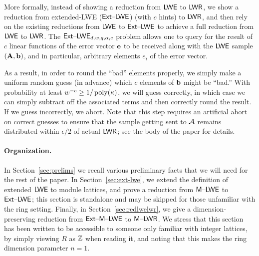 More formally, instead of showing a reduction from $\mathsf{LWE}$ to $\mathsf{LWR}$, we
show a reduction from extended-LWE ($\mathsf{Ext \text{\textendash} LWE}$) (with $c$
hints) to $\mathsf{LWR}$, and then rely on the existing reductions from $\mathsf{LWE}$
to $\mathsf{Ext \text{\textendash} LWE}$ to achieve a full reduction from $\mathsf{LWE}$ to $\mathsf{LWR}$. The $\mathsf{Ext \text{\textendash} LWE}_{d,w,q,\alpha,c}$ problem allows
one to query for the result of $c$ linear functions of the
error vector $\mathbf{e}$ to be received along with the $\mathsf{LWE}$ sample
$(\mathbf{A},\mathbf{b})$, and in
particular, arbitrary elements $e_i$ of the
error vector. 

As a result, in order to round the ``bad'' elements properly, we
simply make a uniform random guess (in advance) which $c$ elements of
$\mathbf{b}$ might be ``bad.''  With probability at least $w^{-c} \geq
1/\operatorname{poly}(\kappa)$, we will guess correctly, in which case we can simply
subtract off the associated terms and then correctly round the
result.  If we guess incorrectly,
we abort. Note that this step requires an artificial abort on correct
guesses to ensure that the sample getting sent to $\mathcal{A}$ remains
distributed within $\epsilon/2$ of actual $\mathsf{LWR}$; see
the body of the paper for details. 





\paragraph{Organization.} In Section~\ref{sec:prelims} we recall
various preliminary facts that we will need for the rest of the
paper. In Section~\ref{sec:ext-lwe}, we extend the definition of
extended $\mathsf{LWE}$ to module lattices, and prove a reduction from $\mathsf{M \text{\textendash} LWE}$
to $\mathsf{Ext \text{\textendash} LWE}$; this section is standalone and may be skipped for those
unfamiliar with the ring setting. Finally, in
Section~\ref{sec:redlwelwr}, we give a dimension-preserving reduction
from $\mathsf{Ext \text{\textendash} M \text{\textendash} LWE}$ to $\mathsf{M \text{\textendash} LWR}$. We stress that this section has been
written to be accessible to someone only familiar with integer
lattices, by simply viewing $R$ as $\mathbb{Z}$ when reading it, and noting
that this makes
the ring dimension parameter $n=1$. 


